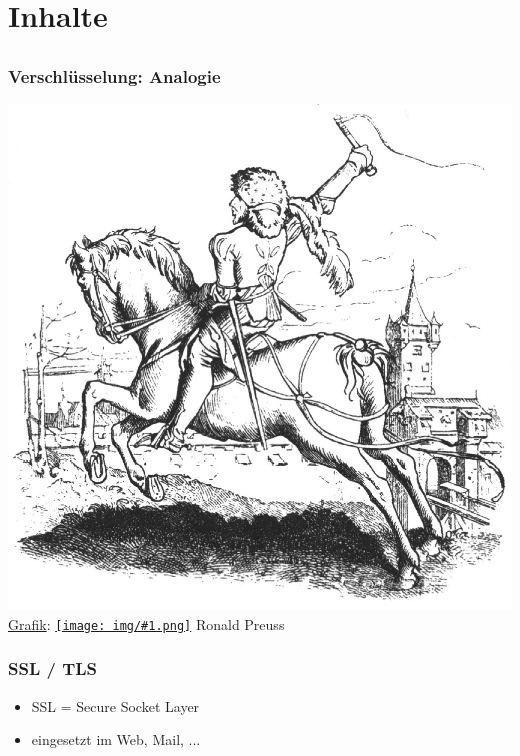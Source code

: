 \documentclass[12pt]{beamer}
\newcommand{\cc}[1]{\texttt{[image: img/\#1.png]}\hspace{1mm}}
\begin{document}
\section{Inhalte}
\subsection{}

\begin{frame}
    \frametitle{Verschlüsselung: Analogie}
    \includegraphics[height=0.7\textheight]{img/bote.jpg}
    {\\ \small \href{http://commons.wikimedia.org/wiki/File:Reitbote.jpg}{Grafik}: \href{http://creativecommons.org/licenses/by-sa/2.5/deed.en}{\cc{by-sa}} Ronald Preuss}
\end{frame}


\begin{frame}
    \frametitle{SSL / TLS}
    \begin{itemize}
      \item<2-> SSL = Secure Socket Layer
      \item<3-> eingesetzt im Web, Mail, ...
    \end{itemize}
\end{frame}
\end{document}

